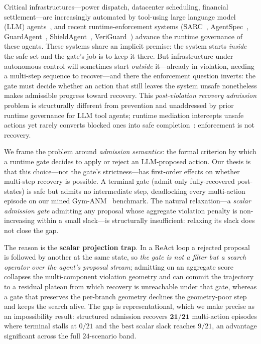 \documentclass[letterpaper]{article} %
\theoremstyle{plain}
\begin{document}
Critical infrastructures---power dispatch, datacenter scheduling, financial settlement---are increasingly automated by tool-using large language model (LLM) agents~\citep{gridagent2025}, and recent runtime-enforcement systems (SARC~\citep{sarc2026}, AgentSpec~\citep{agentspec2026}, GuardAgent~\citep{guardagent2025}, ShieldAgent~\citep{shieldagent2025}, VeriGuard~\citep{veriguard2025}) advance the runtime governance of these agents. These systems share an implicit premise: the system starts \emph{inside} the safe set and the gate's job is to keep it there. But infrastructure under autonomous control will sometimes start \emph{outside} it---already in violation, needing a multi-step sequence to recover---and there the enforcement question inverts: the gate must decide whether an action that still leaves the system unsafe nonetheless makes admissible progress toward recovery. This \emph{post-violation recovery admission} problem is structurally different from prevention and unaddressed by prior runtime governance for LLM tool agents; runtime mediation intercepts unsafe actions yet rarely converts blocked ones into safe completion~\citep{verifiertax2026}: enforcement is not recovery.

We frame the problem around \emph{admission semantics}: the formal criterion by which a runtime gate decides to apply or reject an LLM-proposed action. Our thesis is that this choice---not the gate's strictness---has first-order effects on whether multi-step recovery is possible. A terminal gate (admit only fully-recovered post-states) is safe but admits no intermediate step, deadlocking every multi-action episode on our mined Gym-ANM~\citep{henry2021gymanm} benchmark. The natural relaxation---a \emph{scalar admission gate} admitting any proposal whose aggregate violation penalty is non-increasing within a small slack---is structurally insufficient: relaxing its slack does not close the gap.

The reason is the \textbf{scalar projection trap}. In a ReAct loop a rejected proposal is followed by another at the same state, so \emph{the gate is not a filter but a search operator over the agent's proposal stream}; admitting on an aggregate score collapses the multi-component violation geometry and can commit the trajectory to a residual plateau from which recovery is unreachable under that gate, whereas a gate that preserves the per-branch geometry declines the geometry-poor step and keeps the search alive. The gap is representational, which we make precise as an impossibility result: structured admission recovers $\mathbf{21/21}$ multi-action episodes where terminal stalls at $0/21$ and the best scalar slack reaches $9/21$, an advantage significant across the full $24$-scenario band.
\end{document}
